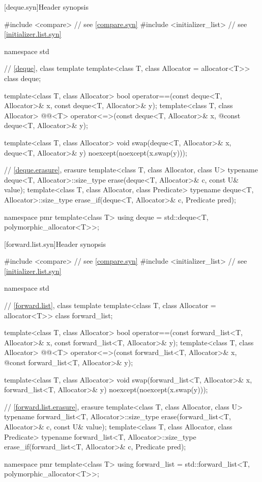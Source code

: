 [deque.syn]{Header  synopsis}

%
\begin{codeblock}
#include <compare>              // see \ref{compare.syn}
#include <initializer_list>     // see \ref{initializer.list.syn}

namespace std {
  // \ref{deque}, class template 
  template<class T, class Allocator = allocator<T>> class deque;

  template<class T, class Allocator>
    bool operator==(const deque<T, Allocator>& x, const deque<T, Allocator>& y);
  template<class T, class Allocator>
    @@<T> operator<=>(const deque<T, Allocator>& x,
    @\itcorr@                                      const deque<T, Allocator>& y);

  template<class T, class Allocator>
    void swap(deque<T, Allocator>& x, deque<T, Allocator>& y)
      noexcept(noexcept(x.swap(y)));

  // \ref{deque.erasure}, erasure
  template<class T, class Allocator, class U>
    typename deque<T, Allocator>::size_type
      erase(deque<T, Allocator>& c, const U& value);
  template<class T, class Allocator, class Predicate>
    typename deque<T, Allocator>::size_type
      erase_if(deque<T, Allocator>& c, Predicate pred);

  namespace pmr {
    template<class T>
      using deque = std::deque<T, polymorphic_allocator<T>>;
  }
}
\end{codeblock}

[forward.list.syn]{Header  synopsis}

%
\begin{codeblock}
#include <compare>              // see \ref{compare.syn}
#include <initializer_list>     // see \ref{initializer.list.syn}

namespace std {
  // \ref{forward.list}, class template 
  template<class T, class Allocator = allocator<T>> class forward_list;

  template<class T, class Allocator>
    bool operator==(const forward_list<T, Allocator>& x, const forward_list<T, Allocator>& y);
  template<class T, class Allocator>
    @@<T> operator<=>(const forward_list<T, Allocator>& x,
    @\itcorr@                                      const forward_list<T, Allocator>& y);

  template<class T, class Allocator>
    void swap(forward_list<T, Allocator>& x, forward_list<T, Allocator>& y)
      noexcept(noexcept(x.swap(y)));

  // \ref{forward.list.erasure}, erasure
  template<class T, class Allocator, class U>
    typename forward_list<T, Allocator>::size_type
      erase(forward_list<T, Allocator>& c, const U& value);
  template<class T, class Allocator, class Predicate>
    typename forward_list<T, Allocator>::size_type
      erase_if(forward_list<T, Allocator>& c, Predicate pred);

  namespace pmr {
    template<class T>
      using forward_list = std::forward_list<T, polymorphic_allocator<T>>;
  }
}
\end{codeblock}

